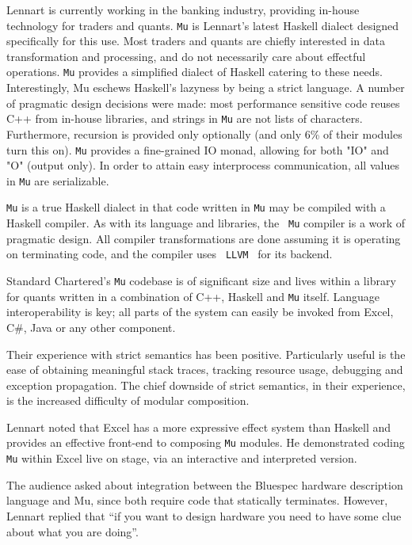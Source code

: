 \documentclass{jfp1}
\begin{document}
Lennart is currently working in the banking industry, providing in-house
technology for traders and quants.  {\tt Mu} is Lennart's latest Haskell
dialect designed specifically for this use.  Most traders and quants are
chiefly interested in data transformation and processing, and do not
necessarily care about effectful operations.  {\tt Mu} provides a simplified
dialect of Haskell catering to these needs.  Interestingly, Mu eschews
Haskell's lazyness by being a strict language.  A number of pragmatic design
decisions were made: most performance sensitive code reuses C++ from in-house
libraries, and strings in {\tt Mu} are not lists of characters.  Furthermore,
recursion is provided only optionally (and only 6\% of their modules turn this
on).  {\tt Mu} provides a fine-grained IO monad, allowing for both "IO" and "O"
(output only).  In order to attain easy interprocess communication, all values
in {\tt Mu} are serializable.

{\tt Mu} is a true Haskell dialect in that code written in {\tt Mu} may be
compiled with a Haskell compiler.  As with its language and libraries, the {\tt
Mu} compiler is a work of pragmatic design.  All compiler transformations are
done assuming it is operating on terminating code, and the compiler uses {\tt
LLVM}~\cite{Lattner:2004:LCF:977395.977673} for its backend.

Standard Chartered's {\tt Mu} codebase is of significant size and lives within
a library for quants written in a combination of C++, Haskell and {\tt Mu}
itself.  Language interoperability is key; all parts of the system can easily
be invoked from Excel, C\#, Java or any other component.

Their experience with strict semantics has been positive.  Particularly useful
is the ease of obtaining meaningful stack traces, tracking resource usage,
debugging and exception propagation.  The chief downside of strict semantics,
in their experience, is the increased difficulty of modular composition.

Lennart noted that Excel has a more expressive effect system than Haskell and
provides an effective front-end to composing {\tt Mu} modules.  He demonstrated
coding {\tt Mu} within Excel live on stage, via an interactive and interpreted
version.

The audience asked about integration between the Bluespec hardware description
language and Mu, since both require code that statically terminates. However,
Lennart replied that ``if you want to design hardware you need to have some
clue about what you are doing''.
\end{document}
